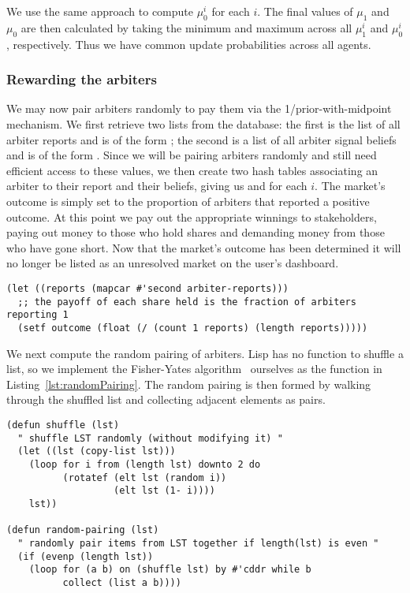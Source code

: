 We use the same approach to compute $\mu_0^i$ for each $i$. The final values of
$\mu_1$ and $\mu_0$ are then calculated by taking the minimum and maximum
across all $\mu_1^i$ and $\mu_0^i$, respectively. Thus we have common update
probabilities across all agents.

\subsubsection{Rewarding the arbiters}

We may now pair arbiters randomly to pay them via the 1/prior-with-midpoint
mechanism. We first retrieve two lists from the database: the first is the list
of all arbiter reports and is of the form ; the second is a list of all arbiter signal beliefs and is of the
form .
Since we will be pairing arbiters randomly and still need efficient access to
these values, we then create two hash tables associating an arbiter to their
report and their beliefs, giving us  and
 for each $i$. The
market's outcome is simply set to the proportion of arbiters that reported a
positive outcome. At this point we pay out the appropriate winnings to
stakeholders, paying out money to those who hold shares and demanding money
from those who have gone short. Now that the market's outcome has been
determined it will no longer be listed as an unresolved market on the user's
dashboard.

\begin{lstlisting}[float,
	label={lst:marketOutcome},
	caption={Computing the market outcome}]
(let ((reports (mapcar #'second arbiter-reports)))
  ;; the payoff of each share held is the fraction of arbiters reporting 1
  (setf outcome (float (/ (count 1 reports) (length reports)))))
\end{lstlisting}

We next compute the random pairing of arbiters. Lisp has no function to shuffle
a list, so we implement the Fisher-Yates
algorithm~\cite[pg.~26-27]{FisherYates1938} ourselves as the 
function in Listing~\ref{lst:randomPairing}. The random pairing is then formed
by walking through the shuffled list and collecting adjacent elements as pairs.

\begin{lstlisting}[float,
	label={lst:randomPairing},
	caption={Assigning arbiters to peers randomly}]
(defun shuffle (lst)
  " shuffle LST randomly (without modifying it) "
  (let ((lst (copy-list lst)))
    (loop for i from (length lst) downto 2 do
          (rotatef (elt lst (random i))
                   (elt lst (1- i))))
    lst))

(defun random-pairing (lst)
  " randomly pair items from LST together if length(lst) is even "
  (if (evenp (length lst))
    (loop for (a b) on (shuffle lst) by #'cddr while b
          collect (list a b))))
\end{lstlisting}


